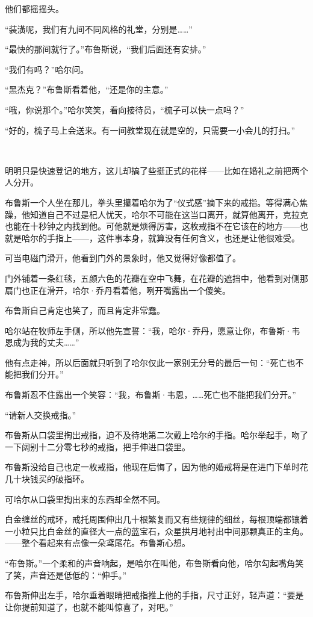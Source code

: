 \documentclass[../main]{subfiles}
\begin{document}
他们都摇摇头。

“装潢呢，我们有九间不同风格的礼堂，分别是……”

“最快的那间就行了。”布鲁斯说，“我们后面还有安排。”

“我们有吗？”哈尔问。

“黑杰克？”布鲁斯看着他，“还是你的主意。”

“哦，你说那个。”哈尔笑笑，看向接待员，“梳子可以快一点吗？”

“好的，梳子马上会送来。有一间教堂现在就是空的，只需要一小会儿的打扫。”

~\

明明只是快速登记的地方，这儿却搞了些挺正式的花样——比如在婚礼之前把两个人分开。

布鲁斯一个人坐在那儿，拳头里攥着哈尔为了“仪式感”摘下来的戒指。等得满心焦躁，他知道自己不过是杞人忧天，哈尔不可能在这当口离开，就算他离开，克拉克也能在十秒钟之内找到他。可他就是烦得厉害，这枚戒指不在它该在的地方——也就是哈尔的手指上——，这件事本身，就算没有任何含义，也还是让他很难受。

可当电磁门滑开，他看到门外的景象时，他又觉得好像都值了。

门外铺着一条红毯，五颜六色的花瓣在空中飞舞，在花瓣的遮挡中，他看到对侧那扇门也正在滑开，哈尔·乔丹看着他，咧开嘴露出一个傻笑。

布鲁斯自己肯定也笑了，而且肯定非常蠢。

哈尔站在牧师左手侧，所以他先宣誓：“我，哈尔·乔丹，愿意让你，布鲁斯·韦恩成为我的丈夫……”

他有点走神，所以后面就只听到了哈尔仅此一家别无分号的最后一句：“死亡也不能把我们分开。”

布鲁斯忍不住露出一个笑容：“我，布鲁斯·韦恩，……死亡也不能把我们分开。”

“请新人交换戒指。”

布鲁斯从口袋里掏出戒指，迫不及待地第二次戴上哈尔的手指。哈尔举起手，吻了一下阔别十二分零七秒的戒指，把手伸进口袋里。

布鲁斯没给自己也定一枚戒指，他现在后悔了，因为他的婚戒将是在进门下单时花几十块钱买的破指环。

可哈尔从口袋里掏出来的东西却全然不同。

白金缠丝的戒环，戒托周围伸出几十根繁复而又有些规律的细丝，每根顶端都镶着一小粒只比白金丝的直径大一点的蓝宝石，众星拱月地衬出中间那颗真正的主角。——整个看起来有点像一朵鸢尾花。布鲁斯心想。

“布鲁斯。”一个柔和的声音响起，是哈尔在叫他，布鲁斯看向他，哈尔勾起嘴角笑了笑，声音还是低低的：“伸手。”

布鲁斯伸出左手，哈尔垂着眼睛把戒指推上他的手指，尺寸正好，轻声道：“要是让你提前知道了，也就不能叫惊喜了，对吧。”
\end{document}
